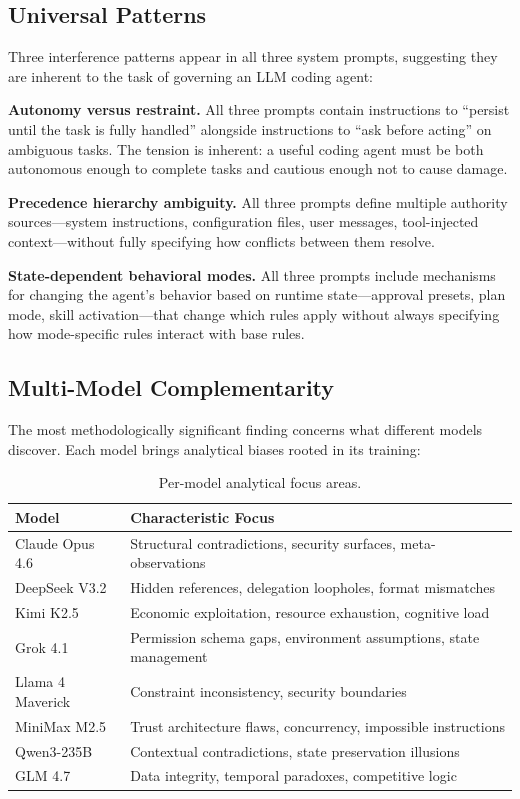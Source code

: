 \documentclass[11pt,a4paper]{article}
\begin{document}
\subsection{Universal Patterns}
\label{sec:universal}

Three interference patterns appear in all three system prompts,
suggesting they are inherent to the task of governing an LLM coding
agent:

\textbf{Autonomy versus restraint.} All three prompts contain
instructions to ``persist until the task is fully handled'' alongside
instructions to ``ask before acting'' on ambiguous tasks. The tension
is inherent: a useful coding agent must be both autonomous enough to
complete tasks and cautious enough not to cause damage.

\textbf{Precedence hierarchy ambiguity.} All three prompts define
multiple authority sources---system instructions, configuration files,
user messages, tool-injected context---without fully specifying how
conflicts between them resolve.

\textbf{State-dependent behavioral modes.} All three prompts include
mechanisms for changing the agent's behavior based on runtime
state---approval presets, plan mode, skill activation---that change
which rules apply without always specifying how mode-specific rules
interact with base rules.


\subsection{Multi-Model Complementarity}
\label{sec:complementarity-results}

The most methodologically significant finding concerns what different
models discover. Each model brings analytical biases rooted in its
training:

\begin{table}[H]
\centering
\caption{Per-model analytical focus areas.}
\label{tab:model-focus}
\begin{tabular}{@{}lp{8cm}@{}}
\toprule
Model & Characteristic Focus \\
\midrule
Claude Opus 4.6 & Structural contradictions, security surfaces, meta-observations \\
DeepSeek V3.2 & Hidden references, delegation loopholes, format mismatches \\
Kimi K2.5 & Economic exploitation, resource exhaustion, cognitive load \\
Grok 4.1 & Permission schema gaps, environment assumptions, state management \\
Llama 4 Maverick & Constraint inconsistency, security boundaries \\
MiniMax M2.5 & Trust architecture flaws, concurrency, impossible instructions \\
Qwen3-235B & Contextual contradictions, state preservation illusions \\
GLM 4.7 & Data integrity, temporal paradoxes, competitive logic \\
\bottomrule
\end{tabular}
\end{table}
\end{document}
